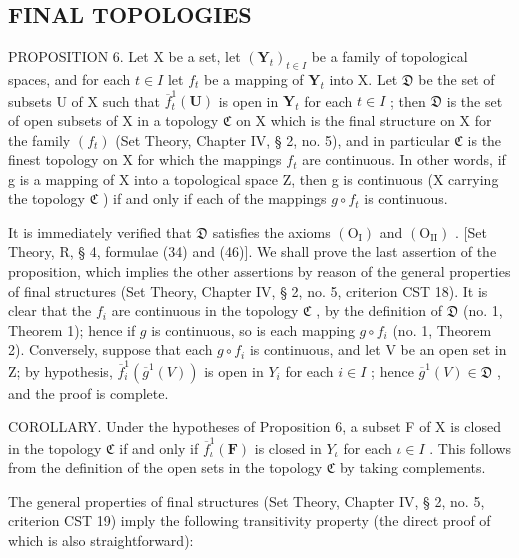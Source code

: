 \subsection{FINAL TOPOLOGIES}

PROPOSITION 6. Let X be a set, let \((\mathbf{Y}_t)_{t \in I}\) be a family of topological spaces, and for each \(t \in I\) let \(f_t\) be a mapping of \(\mathbf{Y}_t\) into X. Let \(\mathfrak{D}\) be the set of subsets U of X such that \(\overline{f}_t^1(\mathbf{U})\) is open in \(\mathbf{Y}_t\) for each \(t \in I\) ; then \(\mathfrak{D}\) is the set of open subsets of X in a topology \(\mathfrak{C}\) on X which is the final structure on X for the family \((f_t)\) (Set Theory, Chapter IV, § 2, no. 5), and in particular \(\mathfrak{C}\) is the finest topology on X for which the mappings \(f_t\) are continuous. In other words, if g is a mapping of X into a topological space Z, then g is continuous (X carrying the topology \(\mathfrak{C}\) ) if and only if each of the mappings \(g \circ f_t\) is continuous.

It is immediately verified that \(\mathfrak{D}\) satisfies the axioms \((\mathrm{O_I})\) and \((\mathrm{O_{II}})\) . {[}Set Theory, R, § 4, formulae (34) and (46){]}. We shall prove the last assertion of the proposition, which implies the other assertions by reason of the general properties of final structures (Set Theory, Chapter IV, § 2, no. 5, criterion CST 18). It is clear that the \(f_{i}\) are continuous in the topology \(\mathfrak{C}\) , by the definition of \(\mathfrak{D}\) (no. 1, Theorem 1); hence if \(g\) is continuous, so is each mapping \(g \circ f_{i}\) (no. 1, Theorem 2). Conversely, suppose that each \(g \circ f_{i}\) is continuous, and let V be an open set in Z; by hypothesis, \(\overline{f}_{i}^{1}(\overline{g}^{1}(V))\) is open in \(Y_{i}\) for each \(i \in I\) ; hence \(\overline{g}^{1}(V) \in \mathfrak{D}\) , and the proof is complete.

COROLLARY. Under the hypotheses of Proposition 6, a subset F of X is closed in the topology \(\mathfrak{C}\) if and only if \(\overline{f}_{\iota}^{1}(\mathbf{F})\) is closed in \(Y_{\iota}\) for each \(\iota \in I\) . This follows from the definition of the open sets in the topology \(\mathfrak{C}\) by taking complements.

The general properties of final structures (Set Theory, Chapter IV, § 2, no. 5, criterion CST 19) imply the following transitivity property (the direct proof of which is also straightforward):

